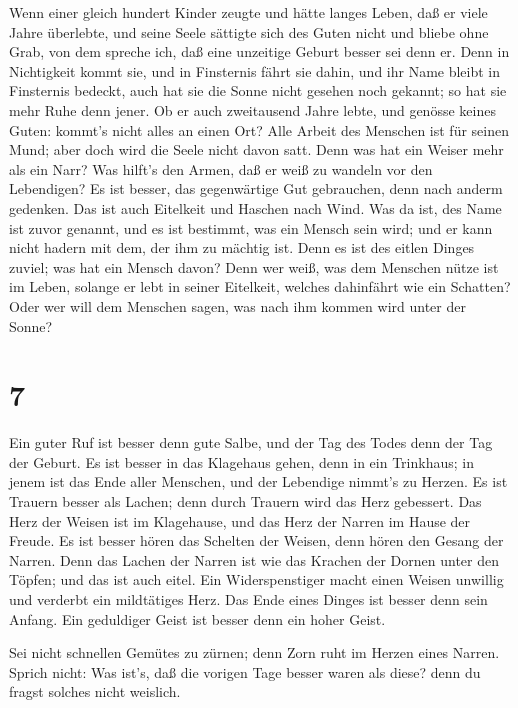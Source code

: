  Wenn einer gleich hundert Kinder zeugte und hätte langes
Leben, daß er viele Jahre überlebte, und seine Seele sättigte sich des
Guten nicht und bliebe ohne Grab, von dem spreche ich, daß eine
unzeitige Geburt besser sei denn er.  Denn in Nichtigkeit
kommt sie, und in Finsternis fährt sie dahin, und ihr Name bleibt in
Finsternis bedeckt,  auch hat sie die Sonne nicht gesehen
noch gekannt; so hat sie mehr Ruhe denn jener.  Ob er auch
zweitausend Jahre lebte, und genösse keines Guten: kommt's nicht alles
an einen Ort?  Alle Arbeit des Menschen ist für seinen Mund;
aber doch wird die Seele nicht davon satt.  Denn was hat ein
Weiser mehr als ein Narr? Was hilft's den Armen, daß er weiß zu wandeln
vor den Lebendigen?  Es ist besser, das gegenwärtige Gut
gebrauchen, denn nach anderm gedenken. Das ist auch Eitelkeit und
Haschen nach Wind.  Was da ist, des Name ist zuvor genannt,
und es ist bestimmt, was ein Mensch sein wird; und er kann nicht hadern
mit dem, der ihm zu mächtig ist.  Denn es ist des eitlen
Dinges zuviel; was hat ein Mensch davon?  Denn wer weiß,
was dem Menschen nütze ist im Leben, solange er lebt in seiner
Eitelkeit, welches dahinfährt wie ein Schatten? Oder wer will dem
Menschen sagen, was nach ihm kommen wird unter der Sonne?

\hypertarget{section-6}{%
\section{7}\label{section-6}}

 Ein guter Ruf ist besser denn gute Salbe, und der Tag des
Todes denn der Tag der Geburt.  Es ist besser in das
Klagehaus gehen, denn in ein Trinkhaus; in jenem ist das Ende aller
Menschen, und der Lebendige nimmt's zu Herzen.  Es ist
Trauern besser als Lachen; denn durch Trauern wird das Herz gebessert.
 Das Herz der Weisen ist im Klagehause, und das Herz der
Narren im Hause der Freude.  Es ist besser hören das
Schelten der Weisen, denn hören den Gesang der Narren.  Denn
das Lachen der Narren ist wie das Krachen der Dornen unter den Töpfen;
und das ist auch eitel.  Ein Widerspenstiger macht einen
Weisen unwillig und verderbt ein mildtätiges Herz.  Das Ende
eines Dinges ist besser denn sein Anfang. Ein geduldiger Geist ist
besser denn ein hoher Geist.

 Sei nicht schnellen Gemütes zu zürnen; denn Zorn ruht im
Herzen eines Narren.  Sprich nicht: Was ist's, daß die
vorigen Tage besser waren als diese? denn du fragst solches nicht
weislich.

